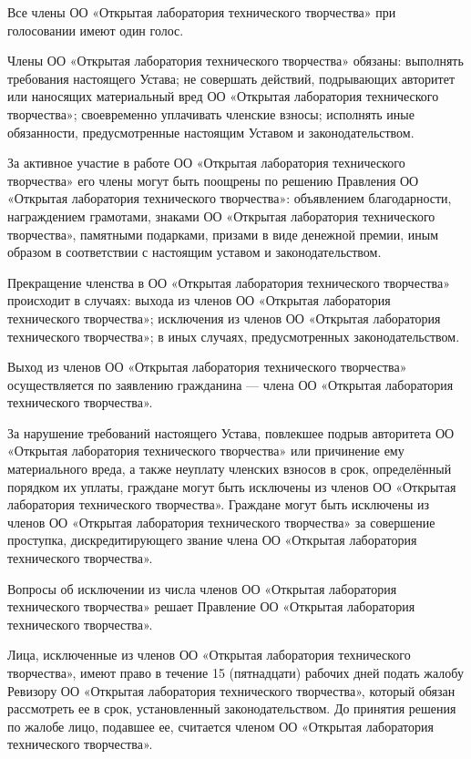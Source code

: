 \documentclass[a4paper,14pt,titlepage]{extarticle}
\begin{document}
Все члены ОО «Открытая лаборатория технического творчества» при голосовании имеют один голос. 

Члены ОО «Открытая лаборатория технического творчества» обязаны:
выполнять требования настоящего Устава;
не совершать действий, подрывающих авторитет или наносящих материальный вред ОО «Открытая лаборатория технического
творчества»;
своевременно уплачивать членские взносы;
исполнять иные обязанности, предусмотренные настоящим Уставом и законодательством.

За активное участие в работе ОО «Открытая лаборатория технического творчества» его члены могут быть поощрены по решению
Правления ОО «Открытая лаборатория технического творчества»: объявлением благодарности, награждением грамотами, знаками
ОО «Открытая лаборатория технического творчества», памятными подарками, призами в виде денежной премии, иным образом в
соответствии с настоящим уставом и законодательством.

Прекращение членства в ОО «Открытая лаборатория технического творчества» происходит в случаях: 
выхода из членов ОО «Открытая лаборатория технического творчества»;
исключения из членов ОО «Открытая лаборатория технического творчества»;
в иных случаях, предусмотренных законодательством.

Выход из членов ОО «Открытая лаборатория технического творчества» осуществляется по заявлению гражданина — члена ОО
«Открытая лаборатория технического творчества». 

За нарушение требований настоящего Устава, повлекшее подрыв авторитета ОО «Открытая лаборатория технического творчества»
или причинение ему материального вреда, а также неуплату членских взносов в срок, определённый порядком их уплаты,
граждане могут быть исключены из членов ОО «Открытая лаборатория технического творчества». Граждане могут быть исключены
из членов ОО «Открытая лаборатория технического творчества» за совершение проступка, дискредитирующего звание члена ОО
«Открытая лаборатория технического творчества».

Вопросы об исключении из числа членов ОО «Открытая лаборатория технического творчества» решает Правление ОО «Открытая
лаборатория технического творчества». 

Лица, исключенные из членов ОО «Открытая лаборатория технического творчества», имеют право в течение 15 (пятнадцати)
рабочих дней подать жалобу Ревизору ОО «Открытая лаборатория технического творчества», который обязан рассмотреть ее в
срок, установленный законодательством. До принятия решения по жалобе лицо, подавшее ее, считается членом ОО «Открытая
лаборатория технического творчества».
\end{document}

